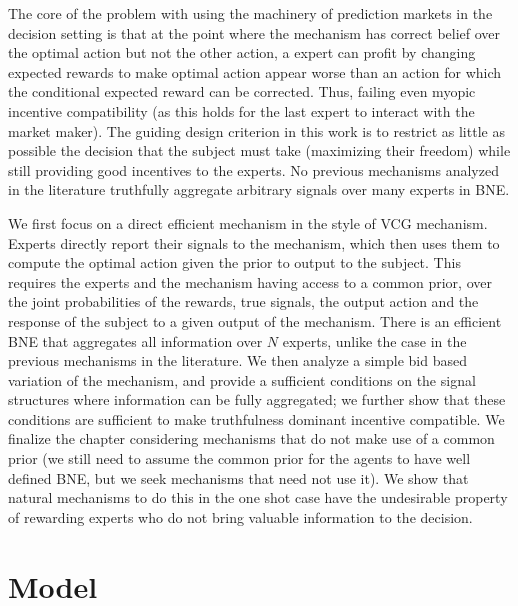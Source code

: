 The core of the problem with using the machinery of prediction markets in the decision setting is that at the point where the mechanism has correct belief over the optimal action but not the other action, a expert  can profit by changing expected rewards to make optimal action appear worse than an action for which the conditional expected reward can be corrected. Thus, failing even myopic incentive compatibility (as this holds for the last expert to interact with the market maker).
The guiding design criterion in this work is to restrict as little as possible the decision that the subject must take (maximizing their freedom) while still providing good incentives to the experts. No previous mechanisms analyzed in the literature truthfully aggregate arbitrary signals over many experts in BNE. 

We first focus on a direct efficient mechanism in the style of VCG mechanism. Experts directly report their signals to the mechanism, which then uses them to compute the optimal action given the prior to output to the subject. This requires  the experts and the mechanism having access to a common prior, over the joint probabilities of the rewards, true signals, the output action and the response of the subject to a given output of the mechanism. There is an efficient BNE that aggregates all information over $N$ experts, unlike the case in the previous mechanisms in the literature.
We then analyze a simple bid based variation of the mechanism, and provide a sufficient conditions on the signal structures where information can be fully aggregated; we further show that these conditions are sufficient to make truthfulness dominant incentive compatible.  
We finalize the chapter considering mechanisms that do not make use of a common prior (we still need to assume the common prior for the agents to have well defined BNE, but we seek mechanisms that need not use it). We show that natural mechanisms to do this in the one shot case have the undesirable property of rewarding experts who do not bring valuable information to the decision.

\section{Model}


